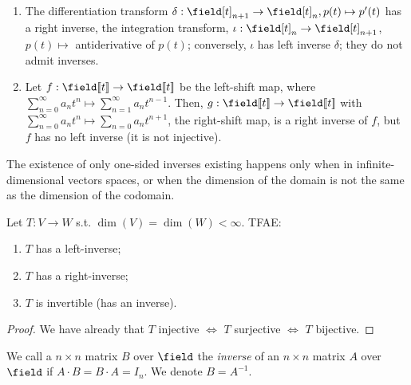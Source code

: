 \begin{example}
    \begin{enumerate}
        \item The differentiation transform $\delta : \field[t]_{n+1} \to \field[t]_{n}, p(t) \mapsto p'(t)$ has a right inverse, the integration transform, $\iota : \field[t]_{n} \to \field[t]_{n+1}$, $p(t) \mapsto$ antiderivative of $p(t)$; conversely, $\iota$ has left inverse $\delta$; they do not admit inverses.
        \item Let $f:  \field[\![t]\!] \to \field[\![t]\!]$ be the left-shift map, where $\sum_{n=0}^\infty a_n t^n \mapsto \sum_{n=1}^\infty a_n t^{n-1}$. Then, $g : \field[\![t]\!] \to \field[\![t]\!]$ with $\sum_{n=0}^\infty a_n t^n \mapsto \sum_{n=0}a_n t^{n+1}$, the right-shift map, is a right inverse of $f$, but $f$ has no left inverse (it is not injective).
    \end{enumerate}
\end{example}

\begin{remark}
    The existence of only one-sided inverses existing happens only when in infinite-dimensional vectors spaces, or when the dimension of the domain is not the same as the dimension of the codomain.
\end{remark}

\begin{corollary}\label{cor:sillyrncor}
    Let $T : V \to W$ s.t. $\dim(V) = \dim(W) < \infty$. TFAE:
    \begin{enumerate}
        \item $T$ has a left-inverse;
        \item $T$ has a right-inverse;
        \item $T$ is invertible (has an inverse).
    \end{enumerate}
\end{corollary}

\begin{proof}
    We have already that $T$ injective $\iff$ $T$ surjective $\iff$ $T$ bijective.
\end{proof}

\begin{definition}
    We call a $n \times n$ matrix $B$ over $\field$ the \emph{inverse} of an $n \times n$ matrix $A$ over $\field$ if $A \cdot B = B \cdot A = I_n$. We denote $B = A^{-1}$.
\end{definition}

